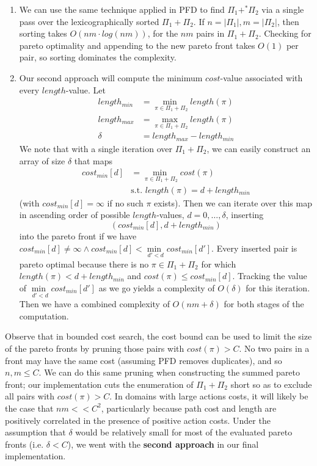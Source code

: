 \documentclass[letterpaper]{article} %
\begin{document}
\begin{enumerate}
\item
  We can use the same technique applied in PFD
  to find \(\Pi_1 +^* \Pi_2\) via a single pass
  over the lexicographically sorted \(\Pi_1 + \Pi_2\).
  If \(n = |\Pi_1|, m = |\Pi_2|\), then sorting takes \(O(n m \cdot log(n m))\),
  for the \(n m\) pairs in \(\Pi_1 + \Pi_2\).
  Checking for pareto optimality and appending to the new pareto front takes \(O(1)\) per pair,
  so sorting dominates the complexity.
\item
  Our second approach will compute the minimum \(cost\)-value associated with every \(length\)-value.
  Let
  \begin{align*}
  length_{min} &= \underset{\pi \in \Pi_1 + \Pi_2}{\operatorname{min\ }} length(\pi) \\
  length_{max} &= \underset{\pi \in \Pi_1 + \Pi_2}{\operatorname{max\ }} length(\pi) \\
  \delta &= length_{max} - length_{min}
  \end{align*}
  We note that with a single iteration over \(\Pi_1 + \Pi_2\),
  we can easily construct an array of size \(\delta\) that maps
  \begin{align*}
    cost_{min}[d] &= \underset{\pi \in \Pi_1 + \Pi_2}{\operatorname{min\ }} cost(\pi) \\
    &\text{s.t. } length(\pi) = d + length_{min}
  \end{align*}
  (with \(cost_{min}[d] = \infty\) if no such \(\pi\) exists).
  Then we can iterate over this map in ascending order of possible \(length\)-values,
  \(d  = 0, \ldots, \delta\), inserting \[(cost_{min}[d], d + length_{min})\] into the pareto front if
  we have \(cost_{min}[d] \not = \infty \land cost_{min}[d] < \underset{d' < d}{\operatorname{min\ }} cost_{min}[d']\).
  Every inserted pair is pareto optimal because there is no
  \(\pi \in \Pi_1 + \Pi_2\) for which \(length(\pi) < d + length_{min}\)
  and \(cost(\pi) \leq cost_{min}[d]\).
  Tracking the value of \(\underset{d' < d}{\operatorname{min\ }} cost_{min}[d']\) as we go
  yields a complexity of \(O(\delta)\) for this iteration.
  Then we have a combined complexity of \(O(nm + \delta)\) for both stages of the computation.
  
\end{enumerate}
Observe that in bounded cost search,
the cost bound can be used to limit the size of the pareto fronts
by pruning those pairs with \(cost(\pi) > C\).
No two pairs in a front may have the same cost (assuming PFD removes duplicates),
and so \(n,m \leq C\).
We can do this same pruning when constructing the summed pareto front;
our implementation cuts the enumeration of \(\Pi_1 + \Pi_2\) short so as to exclude all pairs with \(cost(\pi) > C\).
In domains with large actions costs, it will likely be the case that \(nm << C^2\),
particularly because path cost and length are positively correlated in the presence of
positive action costs.
Under the assumption that \(\delta\) would be relatively small for most of the evaluated
pareto fronts (i.e. \(\delta < C\)), we went with the \textbf{second approach} in our final implementation.
\end{document}
